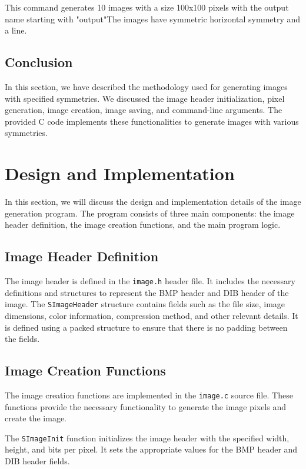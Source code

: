 \documentclass{report}
\begin{document}
This command generates 10 images with a size 100x100 pixels with the output name starting with "output"The images have symmetric horizontal symmetry and a line. 

\subsection{Conclusion}
In this section, we have described the methodology used for generating images with specified symmetries. We discussed the image header initialization, pixel generation, image creation, image saving, and command-line arguments. The provided C code implements these functionalities to generate images with various symmetries.

\section{Design and Implementation}

In this section, we will discuss the design and implementation details of the image generation program. The program consists of three main components: the image header definition, the image creation functions, and the main program logic.

\subsection{Image Header Definition}

The image header is defined in the \texttt{image.h} header file. It includes the necessary definitions and structures to represent the BMP header and DIB header of the image. The \texttt{SImageHeader} structure contains fields such as the file size, image dimensions, color information, compression method, and other relevant details. It is defined using a packed structure to ensure that there is no padding between the fields.

\subsection{Image Creation Functions}

The image creation functions are implemented in the \texttt{image.c} source file. These functions provide the necessary functionality to generate the image pixels and create the image. 

The \texttt{SImageInit} function initializes the image header with the specified width, height, and bits per pixel. It sets the appropriate values for the BMP header and DIB header fields.
\end{document}
